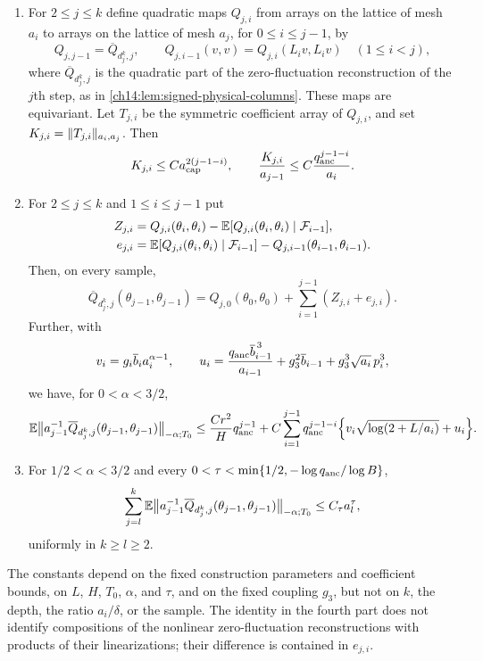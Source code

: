 \begin{theorem}
\begin{enumerate}
\[\]
\item For $2\le j\le k$ define quadratic maps $Q_{j,i}$ from arrays on the lattice of mesh $a_i$ to arrays on the lattice of mesh $a_j$, for $0\le i\le j-1$, by
\[
 Q_{j,j-1}=\overline Q_{d_j^k,j},\qquad Q_{j,i-1}(v,v)=Q_{j,i}(L_iv,L_iv)\quad(1\le i<j),
\]
where $\overline Q_{d_j^k,j}$ is the quadratic part of the zero-fluctuation reconstruction of the $j$th step, as in \cref{ch14:lem:signed-physical-columns}. These maps are equivariant. Let $T_{j,i}$ be the symmetric coefficient array of $Q_{j,i}$, and set $K_{j,i}=\lVert T_{j,i}\rVert_{a_i,a_j}$. Then
\[
 K_{j,i}\le Ca_{\mathrm{cap}}^{2(j-1-i)},\qquad\frac{K_{j,i}}{a_{j-1}}\le C\frac{q_{\mathrm{anc}}^{j-1-i}}{a_i}.
\]
\item For $2\le j\le k$ and $1\le i\le j-1$ put
\[
 \begin{split}
 Z_{j,i}&=Q_{j,i}(\theta_i,\theta_i)-\mathbb E[Q_{j,i}(\theta_i,\theta_i)\mid\mathcal F_{i-1}],\\
 e_{j,i}&=\mathbb E[Q_{j,i}(\theta_i,\theta_i)\mid\mathcal F_{i-1}]-Q_{j,i-1}(\theta_{i-1},\theta_{i-1}).
 \end{split}
\]
Then, on every sample,
\[
 \overline Q_{d_j^k,j}(\theta_{j-1},\theta_{j-1})=Q_{j,0}(\theta_0,\theta_0)+\sum_{i=1}^{j-1}(Z_{j,i}+e_{j,i}).
\]
Further, with
\[
 v_i=g_i\overline b_ia_i^{\alpha-1},\qquad u_i=\frac{q_{\mathrm{anc}}\overline b_{i-1}^{\,3}}{a_{i-1}}+g_3^2\overline b_{i-1}+g_3^3\sqrt{a_i}\,p_i^3,
\]
we have, for $0<\alpha<3/2$,
\[
 \mathbb E\bigl\lVert a_{j-1}^{-1}\overline Q_{d_j^k,j}(\theta_{j-1},\theta_{j-1})\bigr\rVert_{-\alpha;T_0}
 \le\frac{Cr^2}{H}q_{\mathrm{anc}}^{j-1}+C\sum_{i=1}^{j-1}q_{\mathrm{anc}}^{j-1-i}\Bigl\{v_i\sqrt{\log(2+L/a_i)}+u_i\Bigr\}.
\]
\item For $1/2<\alpha<3/2$ and every $0<\tau<\min\{1/2,-\log q_{\mathrm{anc}}/\log B\}$,
\[
 \sum_{j=l}^k\mathbb E\bigl\lVert a_{j-1}^{-1}\overline Q_{d_j^k,j}(\theta_{j-1},\theta_{j-1})\bigr\rVert_{-\alpha;T_0}\le C_\tau a_l^\tau,
\]
uniformly in $k\ge l\ge2$.
\end{enumerate}
The constants depend on the fixed construction parameters and coefficient bounds, on $L$, $H$, $T_0$, $\alpha$, and $\tau$, and on the fixed coupling $g_3$, but not on $k$, the depth, the ratio $a_i/\delta$, or the sample. The identity in the fourth part does not identify compositions of the nonlinear zero-fluctuation reconstructions with products of their linearizations; their difference is contained in $e_{j,i}$.
\end{theorem}

